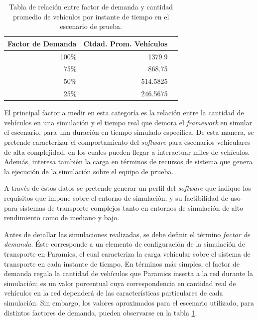\begin{table}[tpb]
    \centering
    \begin{tabular}{@{}rrr@{}}
        \textbf{Factor de Demanda} & \textbf{Ctdad. Prom. Vehículos} \\ \midrule
        100\%           & 1379.9 \\ %
        75\%            & 868.75 \\ %
        50\%            & 514.5825 \\ %
        25\%            & 246.5675 \\ \bottomrule
    \end{tabular}
    \caption{Tabla de relación entre factor de demanda y cantidad promedio de vehículos por instante de tiempo en el escenario de prueba.}
    \label{table:demandfactor}
\end{table}

El principal factor a medir en esta categoría es la relación entre la cantidad de vehículos en una simulación y el tiempo real que demora el \emph{framework} en simular el escenario, para una duración en tiempo simulado específica. De esta manera, se pretende caracterizar el comportamiento del \emph{software} para escenarios vehiculares de alta complejidad, en los cuales pueden llegar a interactuar miles de vehículos. Además, interesa también la carga en términos de recursos de sistema que genera la ejecución de la simulación sobre el equipo de prueba. 

A través de éstos datos se pretende generar un perfil del \emph{software} que indique los requisitos que impone sobre el entorno de simulación, y su factibilidad de uso para sistemas de transporte complejos tanto en entornos de simulación de alto rendimiento como de mediano y bajo.

Antes de detallar las simulaciones realizadas, se debe definir el término \emph{factor de demanda}. Éste corresponde a un elemento de configuración de la simulación de transporte en Paramics, el cual caracteriza la carga vehicular sobre el sistema de transporte en cada instante de tiempo. En términos más simples, el factor de demanda regula la cantidad de vehículos que Paramics inserta a la red durante la simulación; es un valor porcentual cuya correspondencia en cantidad real de vehículos en la red dependerá de las características particulares de cada simulación. Sin embargo, los valores aproximados para el escenario utilizado, para distintos factores de demanda, pueden observarse en la tabla \ref{table:demandfactor}.

